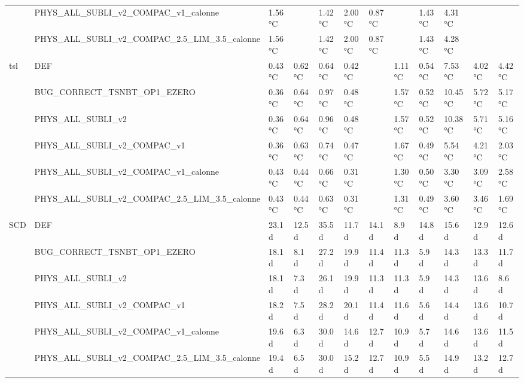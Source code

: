 \begin{tabular}{llllllllllll}
 & PHYS_ALL_SUBLI_v2_COMPAC_v1_calonne & 1.56 °C &  & 1.42 °C & 2.00 °C & 0.87 °C &  & 1.43 °C & 4.31 °C &  &  \\
 & PHYS_ALL_SUBLI_v2_COMPAC_2.5_LIM_3.5_calonne & 1.56 °C &  & 1.42 °C & 2.00 °C & 0.87 °C &  & 1.43 °C & 4.28 °C &  &  \\
\cline{1-12}
\multirow[t]{6}{*}{tsl} & DEF & 0.43 °C & 0.62 °C & 0.64 °C & 0.42 °C &  & 1.11 °C & 0.54 °C & 7.53 °C & 4.02 °C & 4.42 °C \\
 & BUG_CORRECT_TSNBT_OP1_EZERO & 0.36 °C & 0.64 °C & 0.97 °C & 0.48 °C &  & 1.57 °C & 0.52 °C & 10.45 °C & 5.72 °C & 5.17 °C \\
 & PHYS_ALL_SUBLI_v2 & 0.36 °C & 0.64 °C & 0.96 °C & 0.48 °C &  & 1.57 °C & 0.52 °C & 10.38 °C & 5.71 °C & 5.16 °C \\
 & PHYS_ALL_SUBLI_v2_COMPAC_v1 & 0.36 °C & 0.63 °C & 0.74 °C & 0.47 °C &  & 1.67 °C & 0.49 °C & 5.54 °C & 4.21 °C & 2.03 °C \\
 & PHYS_ALL_SUBLI_v2_COMPAC_v1_calonne & 0.43 °C & 0.44 °C & 0.66 °C & 0.31 °C &  & 1.30 °C & 0.50 °C & 3.30 °C & 3.09 °C & 2.58 °C \\
 & PHYS_ALL_SUBLI_v2_COMPAC_2.5_LIM_3.5_calonne & 0.43 °C & 0.44 °C & 0.63 °C & 0.31 °C &  & 1.31 °C & 0.49 °C & 3.60 °C & 3.46 °C & 1.69 °C \\
\cline{1-12}
\multirow[t]{6}{*}{SCD} & DEF & 23.1 d & 12.5 d & 35.5 d & 11.7 d & 14.1 d & 8.9 d & 14.8 d & 15.6 d & 12.9 d & 12.6 d \\
 & BUG_CORRECT_TSNBT_OP1_EZERO & 18.1 d & 8.1 d & 27.2 d & 19.9 d & 11.4 d & 11.3 d & 5.9 d & 14.3 d & 13.3 d & 11.7 d \\
 & PHYS_ALL_SUBLI_v2 & 18.1 d & 7.3 d & 26.1 d & 19.9 d & 11.3 d & 11.3 d & 5.9 d & 14.3 d & 13.6 d & 8.6 d \\
 & PHYS_ALL_SUBLI_v2_COMPAC_v1 & 18.2 d & 7.5 d & 28.2 d & 20.1 d & 11.4 d & 11.6 d & 5.6 d & 14.4 d & 13.6 d & 10.7 d \\
 & PHYS_ALL_SUBLI_v2_COMPAC_v1_calonne & 19.6 d & 6.3 d & 30.0 d & 14.6 d & 12.7 d & 10.9 d & 5.7 d & 14.6 d & 13.6 d & 11.5 d \\
 & PHYS_ALL_SUBLI_v2_COMPAC_2.5_LIM_3.5_calonne & 19.4 d & 6.5 d & 30.0 d & 15.2 d & 12.7 d & 10.9 d & 5.5 d & 14.9 d & 13.2 d & 12.7 d \\
\cline{1-12}
\bottomrule
\end{tabular}
